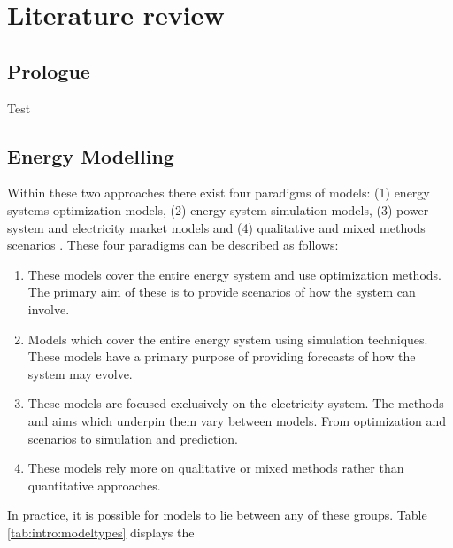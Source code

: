\chapter{Literature review}
\label{chapter:litreview}
\ifpdf
    \graphicspath{{Chapter3/Figs/Raster/}{Chapter3/Figs/PDF/}{Chapter3/Figs/}}
\else
    \graphicspath{{Chapter3/Figs/Vector/}{Chapter3/Figs/}}
\fi

\section{Prologue}

Test

\section{Energy Modelling}

Within these two approaches there exist four paradigms of models: (1) energy systems optimization models, (2) energy system simulation models, (3) power system and electricity market models and (4) qualitative and mixed methods scenarios \cite{Pfenninger2014a}. These four paradigms can be described as follows:

\begin{enumerate}
	\item These models cover the entire energy system and use optimization methods. The primary aim of these is to provide scenarios of how the system can involve.
	\item Models which cover the entire energy system using simulation techniques. These models have a primary purpose of providing forecasts of how the system may evolve.
	\item These models are focused exclusively on the electricity system. The methods and aims which underpin them vary between models. From optimization and scenarios to simulation and prediction.
	\item These models rely more on qualitative or mixed methods rather than quantitative approaches.
\end{enumerate}

In practice, it is possible for models to lie between any of these groups. Table \ref{tab:intro:modeltypes} displays the 

